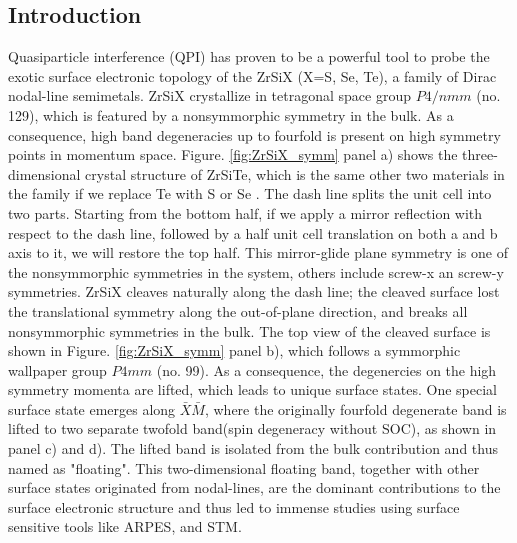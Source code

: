 \subsection{Introduction}
Quasiparticle interference (QPI) has proven to be a powerful tool to probe the exotic surface electronic topology of the ZrSiX (X=S, Se, Te), a family of Dirac nodal-line semimetals. ZrSiX crystallize in tetragonal space group $P4/nmm$ (no. 129), which is featured by a nonsymmorphic symmetry in the bulk. As a consequence, high band degeneracies up to fourfold is present on high symmetry points in momentum space. Figure. \ref{fig:ZrSiX_symm} panel a) shows the three-dimensional crystal structure of ZrSiTe, which is the same other two materials in the family if we replace Te with S or Se \cite{stuartQuasiparticleInterferenceObservation2022}. The dash line splits the unit cell into two parts. Starting from the bottom half, if we apply a mirror reflection with respect to the dash line, followed by a half unit cell translation on both a and b axis to it, we will restore the top half. This mirror-glide plane symmetry is one of the nonsymmorphic symmetries in the system, others include screw-x an screw-y symmetries. ZrSiX cleaves naturally along the dash line; the cleaved surface lost the translational symmetry along the out-of-plane direction, and breaks all nonsymmorphic symmetries in the bulk. The top view of the cleaved surface is shown in Figure. \ref{fig:ZrSiX_symm} panel b), which follows a symmorphic wallpaper group $P4mm$ (no. 99). As a consequence, the degenercies on the high symmetry momenta are lifted, which leads to unique surface states. One special surface state emerges along  $\bar{X}\bar{M}$, where the originally fourfold degenerate band is lifted to two separate twofold band(spin degeneracy without SOC), as shown in panel c) and d)\cite{toppSurfaceFloating2D2017}. The lifted band is isolated from the bulk contribution and thus named as "floating". This two-dimensional floating band, together with other surface states originated from nodal-lines, are the dominant contributions to the surface electronic structure and thus led to immense studies using surface sensitive tools like \ac{ARPES}\cite{toppSurfaceFloating2D2017}\cite{toppNonsymmorphicBandDegeneracy2016}, and \ac{STM}\cite{lodgeObservationEffectivePseudospin2017}\cite{zhuQuasiparticleInterferenceNonsymmorphic2018}\cite{butlerQuasiparticleInterferenceZrSiS2017}\cite{buVisualizationElectronicTopology2018}\cite{stuartQuasiparticleInterferenceObservation2022}. 


